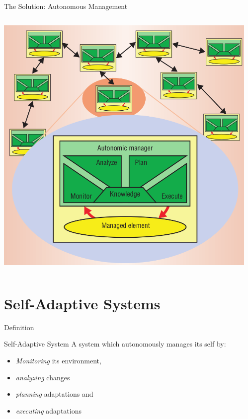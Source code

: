 \documentclass[en,16:9]{sdqbeamer}
\begin{document}
\begin{frame}{The Solution: Autonomous Management}
	\begin{columns}
		 \begin{center}
			\includegraphics[height=0.7\textheight]{sources/MAPEK.png}
		\end{center}
		 \cite{VisionOfAutonomicComputing}
	\end{columns}
\end{frame}

\section{Self-Adaptive Systems}

\begin{frame}{Definition}
	\begin{greenblock}{Self-Adaptive System}
		A system which autonomously manages its self by:
		\begin{itemize}
			\item \textit{Monitoring} its environment,
			\item \textit{analyzing} changes
			\item \textit{planning} adaptations and
			\item \textit{executing} adaptations
		\end{itemize}
	\end{greenblock}
\end{frame}
\end{document}
